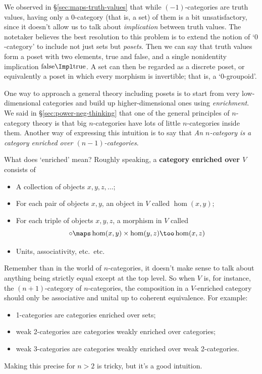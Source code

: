 \documentclass[12pt]{amsart}
\begin{document}
We observed in \S\ref{sec:maps-truth-values} that while
$(-1)$-categories are truth values, having only a $0$-category (that
is, a set) of them is a bit unsatisfactory, since it doesn't allow us
to talk about \emph{implication} between truth values.  The notetaker
believes the best resolution to this problem is to extend the notion
of `$0$-category' to include not just sets but \emph{posets}.  Then we
can say that truth values form a poset with two elements, true and
false, and a single nonidentity implication
$\mathrm{false}\Impl\mathrm{true}$.  A set can then be regarded as a
discrete poset, or equivalently a poset in which every morphism is
invertible; that is, a `$0$-groupoid'.

One way to approach a general theory including posets is to start from
very low-dimensional categories and build up higher-dimensional ones
using \emph{enrichment}.  We said in \S\ref{sec:power-neg-thinking}
that one of the general principles of $n$-category theory is that big
$n$-categories have lots of little $n$-categories inside them.
Another way of expressing this intuition is to say that \emph{An
  $n$-category is a category enriched over $(n-1)$-categories}.

What does `enriched' mean?  Roughly speaking, a \textbf{category
  enriched over $V$} consists of
\begin{itemize}
\item A collection of objects $x,y,z,\dots$;
\item For each pair of objects $x,y$, an object in $V$ called $\hom(x,y)$;
\item For each triple of objects $x,y,z$, a morphism in $V$ called
  \[\circ \maps \hom(x,y)\times \hom(y,z)\too\hom(x,z)\]
\item Units, associativity, etc.\ etc.\
\end{itemize}
Remember than in the world of $n$-categories, it doesn't make sense to
talk about anything being strictly equal except at the top level.  So
when $V$ is, for instance, the $(n+1)$-category of $n$-categories, the
composition in a $V$-enriched category should only be associative and
unital up to coherent equivalence.  For example:
\begin{itemize}
\item 1-categories are categories enriched over sets;
\item weak 2-categories are categories weakly enriched over
  categories;
\item weak 3-categories are categories weakly enriched over
  weak 2-categories.
\end{itemize}
Making this precise for $n>2$ is tricky, but it's a good intuition.
\end{document}
